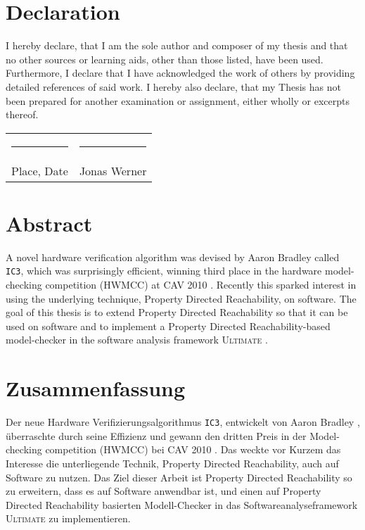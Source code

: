 \documentclass[11pt, a4paper, BCOR=10mm, ngerman]{scrbook}
\begin{document}
\pagebreak

\chapter*{Declaration}

I hereby declare, that I am the sole author and composer of my thesis and that no other sources or learning aids, other than those listed, have been used. Furthermore, I declare that I have acknowledged the work of others by providing detailed references of said work.  \newline
I hereby also declare, that my Thesis has not been prepared for another examination
or assignment, either wholly or excerpts thereof.
\\[3\normalbaselineskip]
\begin{tabular}{p{} l}
  \rule{0.33\textwidth}{0.4pt}   &   \rule{0.33\textwidth}{0.4pt} \\
  Place, Date                  &   Jonas Werner
\end{tabular}

\chapter*{Abstract}
A novel hardware verification algorithm was devised by Aaron Bradley \cite{DBLP:conf/vmcai/Bradley11} called \texttt{IC3}, which was surprisingly efficient, winning third place in the hardware
model-checking competition (HWMCC) at CAV 2010 \cite{cav}. Recently this sparked interest in using the underlying technique, Property Directed Reachability, on software.
The goal of this thesis is to extend Property Directed Reachability so that it can be used on software and to implement a Property Directed Reachability-based model-checker in the software analysis framework \textsc{Ultimate} \cite{Zitat02}.


\chapter*{Zusammenfassung}
Der neue Hardware Verifizierungsalgorithmus \texttt{IC3}, entwickelt von Aaron Bradley \cite{DBLP:conf/vmcai/Bradley11}, überraschte durch seine Effizienz und gewann den dritten Preis in der Model-checking competition (HWMCC) bei CAV 2010 \cite{cav}. Das weckte vor Kurzem das Interesse die unterliegende Technik, Property Directed Reachability, auch auf Software zu nutzen. Das Ziel dieser Arbeit ist Property Directed Reachability so zu erweitern, dass es auf Software anwendbar ist, und einen auf Property Directed Reachability basierten  Modell-Checker in das Softwareanalyseframework \textsc{Ultimate} zu implementieren.
\end{document}
